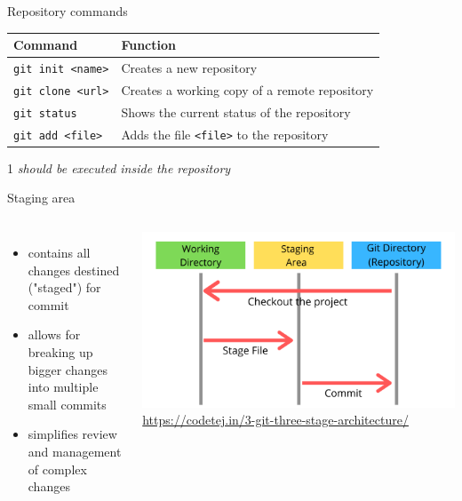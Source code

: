 \documentclass[10pt, graphics, aspectratio=169, table]{beamer}
\begin{document}
    \begin{frame}{Repository commands}
        \begin{table}
            \centering
            \begin{threeparttable}
                \begin{tabular}{ll}
                    \toprule
                    Command & Function \\
                    \midrule
                    \texttt{git init <name>} & Creates a new repository \\
                    \texttt{git clone <url>} & Creates a working copy of a remote repository \\
                    \texttt{git status} & Shows the current status of the repository\tnote{1} \\
                    \texttt{git add <file>} & Adds the file \texttt{<file>} to the repository\tnote{1}\\
                    \bottomrule
                \end{tabular}
                \begin{tablenotes}
                    \item [1]\emph{should be executed inside the repository}
                \end{tablenotes}
            \end{threeparttable}
        \end{table}
    \end{frame}

    \begin{frame}{Staging area}
        \begin{columns}
                \begin{itemize}
                    \item contains all changes destined ("staged") for commit
                    \item allows for breaking up bigger changes into multiple small commits
                    \item simplifies review and management of complex changes
                \end{itemize}
                \center\includegraphics[scale=0.18]{img/staging.png}
                \center\tiny\url{https://codetej.in/3-git-three-stage-architecture/}
        \end{columns}
    \end{frame}
\end{document}
